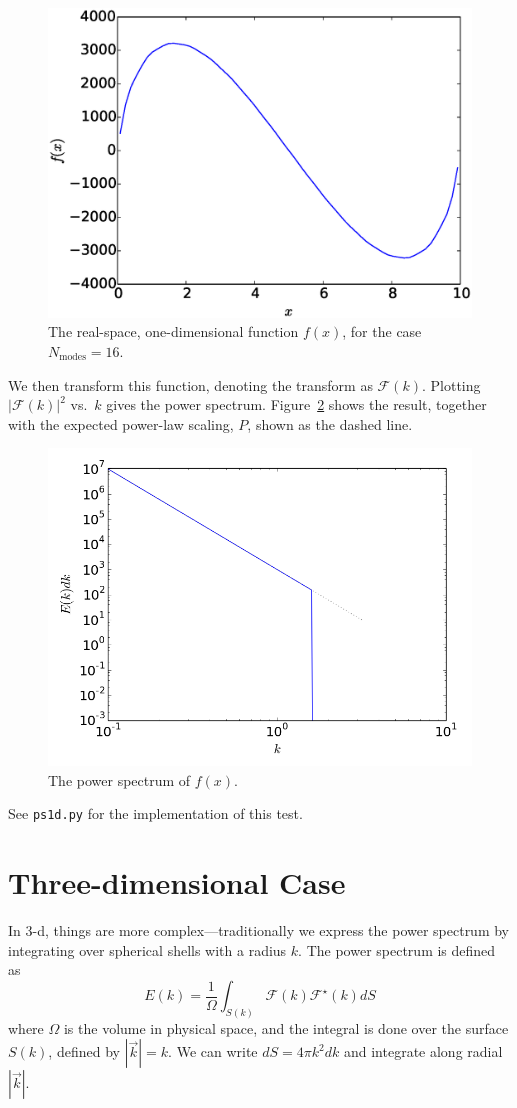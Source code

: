 \documentclass[11pt]{article}
\begin{document}
\begin{figure}[t]
\centering
\includegraphics[width=0.5\linewidth]{phi_1d}
\begin{minipage}[b]{0.45\linewidth}
\caption{\label{fig:phi1d} The real-space, one-dimensional function $f(x)$,
for the case $N_\mathrm{modes} = 16$.}
\end{minipage}
\end{figure}

We then transform this function, denoting the transform as $\mathcal{F}(k)$.  Plotting
$|\mathcal{F}(k)|^2$ vs.\ $k$ gives the power spectrum.  Figure~\ref{fig:ps1d} shows
the result, together with the expected power-law scaling, $P$, shown as the 
dashed line.

\begin{figure}[t]
\centering
\includegraphics[width=0.5\linewidth]{ps1d}
\begin{minipage}[b]{0.45\linewidth}
\caption{\label{fig:ps1d} The power spectrum of $f(x)$.}
\end{minipage}
\end{figure}



See {\tt ps1d.py} for the implementation of this test.



\section*{Three-dimensional Case}

In 3-d, things are more complex---traditionally we express the power
spectrum by integrating over spherical shells with a radius $k$.  The
power spectrum is defined as
\begin{equation}
E(k) = \frac{1}{\Omega} \int_{S(k)} \mathcal{F}(k) \mathcal{F}^\star(k) dS
\end{equation}
where $\Omega$ is the volume in physical space, and the integral is done
over the surface $S(k)$, defined by $|\vec{k}| = k$.  We can
write $dS = 4\pi k^2 dk$ and integrate along radial $|\vec{k}|$.
\end{document}
